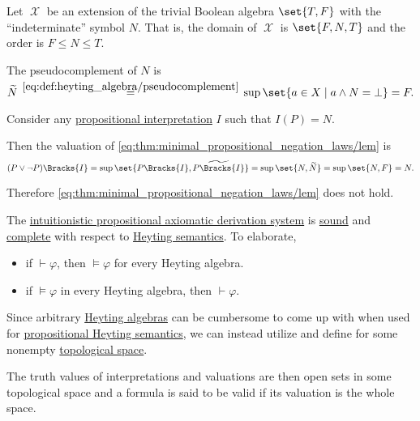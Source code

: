 \begin{example}\label{ex:heyting_semantics_lem_counterexample}
  Let \( \mscrX \) be an extension of the trivial Boolean algebra \( \set{ T, F } \) with the \enquote{indeterminate} symbol \( N \). That is, the domain of \( \mscrX \) is \( \set{ F, N, T } \) and the order is \( F \leq N \leq T \).

  The pseudocomplement of \( N \) is
  \begin{equation*}
    \widetilde{N}
    \reloset {\eqref{eq:def:heyting_algebra/pseudocomplement}} =
    \sup\set{ a \in X \given a \wedge N = \bot }
    =
    F.
  \end{equation*}

  Consider any \hyperref[def:propositional_valuation]{propositional interpretation} \( I \) such that \( I(P) = N \).

  Then the valuation of \eqref{eq:thm:minimal_propositional_negation_laws/lem} is
  \begin{equation*}
    (P \vee \neg P)\Bracks{I}
    =
    \sup\set{ P\Bracks{I}, \widetilde{P\Bracks{I}} }
    =
    \sup\set{ N, \widetilde{N} }
    =
    \sup\set{ N, F }
    =
    N.
  \end{equation*}

  Therefore \eqref{eq:thm:minimal_propositional_negation_laws/lem} does not hold.
\end{example}

\begin{theorem}\label{thm:intuitionistic_propositional_logic_is_sound_and_complete}
  The \hyperref[def:intuitionistic_propositional_axiomatic_derivation_system]{intuitionistic propositional axiomatic derivation system} is \hyperref[def:derivability_and_satisfiability/soundness]{sound} and \hyperref[def:derivability_and_satisfiability/completeness]{complete} with respect to \hyperref[def:propositional_heyting_algebra_semantics]{Heyting semantics}. To elaborate,
  \begin{itemize}
    \item if \( \vdash \varphi \), then \( \vDash \varphi \) for every Heyting algebra.
    \item if \( \vDash \varphi \) in every Heyting algebra, then \( \vdash \varphi \).
  \end{itemize}
\end{theorem}

\begin{definition}\label{def:propositional_topological_semantics}
  Since arbitrary \hyperref[def:heyting_algebra]{Heyting algebras} can be cumbersome to come up with when used for \hyperref[def:propositional_heyting_algebra_semantics]{propositional Heyting semantics}, we can instead utilize  and define  for some nonempty \hyperref[def:topological_space]{topological space}.

  The truth values of interpretations and valuations are then open sets in some topological space and a formula is said to be valid if its valuation is the whole space.
\end{definition}

